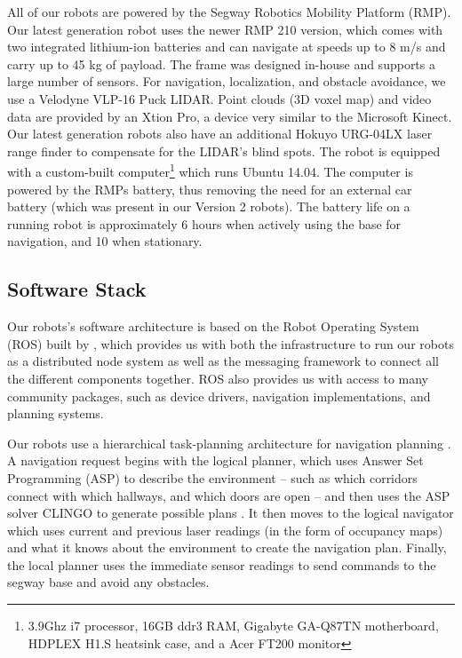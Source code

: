 \documentclass[
  oneside,
  11pt, a4paper,
  footinclude=true,
  headinclude=true,
  cleardoublepage=empty
]{article}
\begin{document}
All of our robots are powered by the Segway Robotics Mobility Platform (RMP).
Our latest generation robot uses the newer RMP 210 version, which comes with two
integrated lithium-ion batteries and can navigate at speeds up to 8
m/s and carry up to 45 kg of payload. The frame was designed in-house
and supports a large number of sensors. For navigation, localization, and
obstacle avoidance, we use a Velodyne VLP-16 Puck LIDAR. Point clouds (3D voxel
map) and video data are provided by an Xtion Pro, a device very similar to the
Microsoft Kinect. Our latest generation robots also have an additional Hokuyo
URG-04LX laser range finder to compensate for the LIDAR's blind spots. The
robot is equipped with a custom-built computer\footnote{3.9Ghz i7 processor,
16GB ddr3 RAM, Gigabyte GA-Q87TN motherboard, HDPLEX H1.S heatsink case, and a
Acer FT200 monitor} which runs Ubuntu 14.04. The computer is powered by the
RMPs battery, thus removing the need for an external car battery (which was
present in our Version 2 robots). The battery life on a running robot is
approximately 6 hours when actively using the base for navigation, and 10 when
stationary.

\subsection{Software Stack}

Our robots's software architecture is based on the Robot Operating System (ROS)
built by \citet{quigley2009}, which provides us with both the infrastructure to
run our robots as a distributed node system as well as the messaging framework
to connect all the different components together. ROS also provides us with
access to many community packages, such as device drivers, navigation
implementations, and planning systems.

Our robots use a hierarchical task-planning architecture for navigation
planning \citep{zhang2014}. A navigation request begins with the logical
planner, which uses Answer Set Programming (ASP) to describe the environment
\citep{lifschitz2008} -- such as which corridors connect with which hallways,
and which doors are open -- and then uses the ASP solver CLINGO to generate
possible plans \citep{gebser2014clingo}. It then moves to the logical navigator
which uses current and previous laser readings (in the form of occupancy maps)
and what it knows about the environment to create the navigation plan. Finally,
the local planner uses the immediate sensor readings to send commands to the
segway base and avoid any obstacles.
\end{document}
